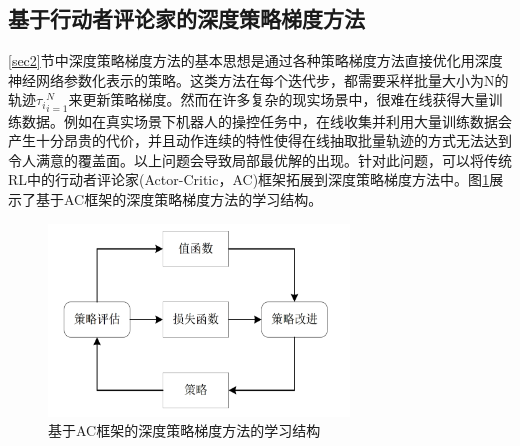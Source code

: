 \documentclass[bachelor]{thesis-uestc}
\begin{document}
	\subsection{基于行动者评论家的深度策略梯度方法}
	\ref{sec2}节中深度策略梯度方法的基本思想是通过各种策略梯度方法直接优化用深度神经网络参数化表示的策略。这类方法在每个迭代步，都需要采样批量大小为N的轨迹${\tau_i}^N_{i=1}$来更新策略梯度。然而在许多复杂的现实场景中，很难在线获得大量训练数据。例如在真实场景下机器人的操控任务中，在线收集并利用大量训练数据会产生十分昂贵的代价，并且动作连续的特性使得在线抽取批量轨迹的方式无法达到令人满意的覆盖面。以上问题会导致局部最优解的出现。针对此问题，可以将传统RL中的行动者评论家(Actor-Critic，AC)框架拓展到深度策略梯度方法中。图\ref{fg5}展示了基于AC框架的深度策略梯度方法的学习结构。
	\begin{figure}
		\includegraphics[width=8cm]{./pic/fg5.jpg}
		\caption{基于AC框架的深度策略梯度方法的学习结构}
		\label{fg5}
	\end{figure}
\end{document}

